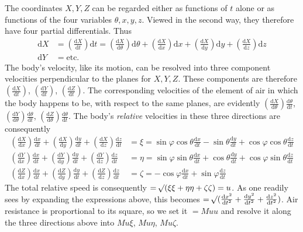 The coordinates $X,Y,Z$ can be regarded either as functions of $t$ alone or as functions of the four variables $\theta,x,y,z$. Viewed in the second way, they therefore have four partial differentials. Thus
\[
\begin{aligned}
\mathrm{d}X&=(\tfrac{\mathrm{d}X}{\mathrm{d}t})\mathrm{d}t=(\tfrac{\mathrm{d}X}{\mathrm{d}\theta})\mathrm{d}\theta+(\tfrac{\mathrm{d}X}{\mathrm{d}x})\mathrm{d}x+(\tfrac{\mathrm{d}X}{\mathrm{d}y})\mathrm{d}y+(\tfrac{\mathrm{d}X}{\mathrm{d}z})\mathrm{d}z\\
\mathrm{d}Y&=\mathrm{etc.}
\end{aligned}
\]
The body's velocity, like its motion, can be resolved into three component velocities perpendicular to the planes for $X,Y,Z$. These components are therefore $(\tfrac{\mathrm{d}X}{\mathrm{d}t})$, $(\tfrac{\mathrm{d}Y}{\mathrm{d}t})$, $(\tfrac{\mathrm{d}Z}{\mathrm{d}t})$. The corresponding velocities of the element of air in which the body happens to be, with respect to the same planes, are evidently $(\tfrac{\mathrm{d}X}{\mathrm{d}\theta})\tfrac{\mathrm{d}\theta}{\mathrm{d}t}$, $(\tfrac{\mathrm{d}Y}{\mathrm{d}\theta})\tfrac{\mathrm{d}\theta}{\mathrm{d}t}$, $(\tfrac{\mathrm{d}Z}{\mathrm{d}\theta})\tfrac{\mathrm{d}\theta}{\mathrm{d}t}$. The body's \textit{relative} velocities in these three directions are consequently
\[
\begin{aligned}
(\tfrac{\mathrm{d}X}{\mathrm{d}x})\tfrac{\mathrm{d}x}{\mathrm{d}t}+(\tfrac{\mathrm{d}X}{\mathrm{d}y})\tfrac{\mathrm{d}y}{\mathrm{d}t}+(\tfrac{\mathrm{d}X}{\mathrm{d}z})\tfrac{\mathrm{d}z}{\mathrm{d}t}&=\xi=\sin\varphi\cos\theta\tfrac{\mathrm{d}x}{\mathrm{d}t}-\sin\theta\tfrac{\mathrm{d}y}{\mathrm{d}t}+\cos\varphi\cos\theta\tfrac{\mathrm{d}z}{\mathrm{d}t}\\
(\tfrac{\mathrm{d}Y}{\mathrm{d}x})\tfrac{\mathrm{d}x}{\mathrm{d}t}+(\tfrac{\mathrm{d}Y}{\mathrm{d}y})\tfrac{\mathrm{d}y}{\mathrm{d}t}+(\tfrac{\mathrm{d}Y}{\mathrm{d}z})\tfrac{\mathrm{d}z}{\mathrm{d}t}&=\eta=\sin\varphi\sin\theta\tfrac{\mathrm{d}x}{\mathrm{d}t}+\cos\theta\tfrac{\mathrm{d}y}{\mathrm{d}t}+\cos\varphi\sin\theta\tfrac{\mathrm{d}z}{\mathrm{d}t}\\
(\tfrac{\mathrm{d}Z}{\mathrm{d}x})\tfrac{\mathrm{d}x}{\mathrm{d}t}+(\tfrac{\mathrm{d}Z}{\mathrm{d}y})\tfrac{\mathrm{d}y}{\mathrm{d}t}+(\tfrac{\mathrm{d}Z}{\mathrm{d}z})\tfrac{\mathrm{d}z}{\mathrm{d}t}&=\zeta=-\cos\varphi\tfrac{\mathrm{d}x}{\mathrm{d}t}+\sin\varphi\tfrac{\mathrm{d}z}{\mathrm{d}t}
\end{aligned}
\]
The total relative speed is consequently $=\mathord{{}^{}\!\surd}(\xi\xi+\eta\eta+\zeta\zeta)=u$. As one readily sees by expanding the expressions above, this becomes $=\mathord{{}^{}\!\surd}(\tfrac{\mathrm{d}x^2}{\mathrm{d}t^2}+\tfrac{\mathrm{d}y^2}{\mathrm{d}t^2}+\tfrac{\mathrm{d}z^2}{\mathrm{d}t^2})$. Air resistance is proportional to its square, so we set it $=Muu$ and resolve it along the three directions above into $Mu\xi$, $Mu\eta$, $Mu\zeta$.

